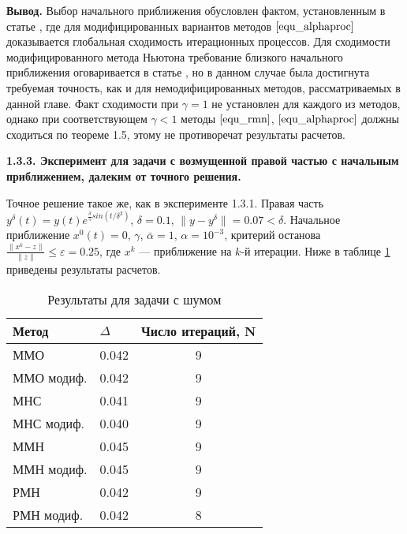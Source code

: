 {\bfseries\large Вывод.} Выбор начального приближения обусловлен фактом, установленным в статье \cite{Vasin2016}, где для модифицированных вариантов методов $\eqref{equ_alphaproc}$ доказывается глобальная сходимость итерационных процессов. Для сходимости модифицированного метода Ньютона требование близкого начального приближения оговаривается в статье \cite{VasAkiMin2013}, но в данном случае была достигнута требуемая точность, как и для немодифицированных методов, рассматриваемых в данной главе. Факт сходимости при $\gamma=1$ не установлен для каждого из методов, однако при соответствующем $\gamma<1$ методы $\eqref{equ_rmn}$, $\eqref{equ_alphaproc}$ должны сходиться по теореме 1.5, этому не противоречат результаты расчетов.

\newpage
{\bfseries 1.3.3. Эксперимент для задачи с возмущенной правой частью с начальным приближением, далеким от точного решения.} 

Точное решение такое же, как в эксперименте 1.3.1. Правая часть $y^\delta(t)=y(t)e^{\frac{\delta}{5} sin(t/{\delta}^2)}$, $\delta=0.1$, $\|y-y^{\delta}\|=0.07<\delta$. Начальное приближение $x^0(t)=0$, $\gamma$, $\bar\alpha=1$, $\alpha=10^{-3}$, критерий останова $\frac{\|x^k-z\|}{\|z\|}\le\varepsilon=0.25$, где $x^k$ --- приближение на $k$-й итерации. Ниже в таблице \ref{table1.3} приведены результаты расчетов.
\begin{table}[H]
	\centering
	\caption{Результаты для задачи с шумом}
	\label{table1.3}
	\begin{tabular}{|l|c|c|}
		\hline
		\textbf{Метод}                   & \multicolumn{1}{l|}{\textbf{$\Delta$}} & \multicolumn{1}{l|}{\textbf{Число итераций, N}} \\ \hline
		ММО                              & 0.042                                  & 9                                               \\ \hline
		\multicolumn{1}{|r|}{ММО модиф.} & 0.042                                  & 9                                               \\ \hline
		МНС                              & 0.041                                  & 9                                               \\ \hline
		МНС модиф.                       & 0.040                                  & 9                                               \\ \hline
		ММН                              & 0.045                                  & 9                                               \\ \hline
		ММН модиф.                       & 0.045                                  & 9                                               \\ \hline
		РМН                              & 0.042                                  & 9                                               \\ \hline
		РМН модиф.                       & 0.042                                  & 8                                               \\ \hline
	\end{tabular}
\end{table}


